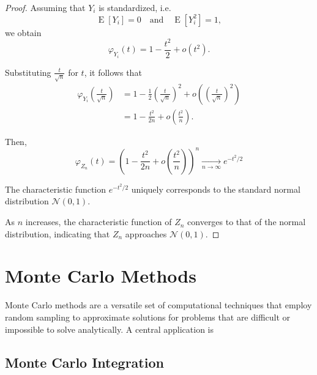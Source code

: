 \documentclass[10pt, headings=standardclasses, parskip=half, twoside]{scrartcl}
\begin{document}
\begin{proof}
Assuming that $Y_{i}$ is standardized, i.e. 
\[
\operatorname{E}\left[Y_{i}\right]=0 \quad \text{and} \quad \operatorname{E}\left[Y_{i}^2\right]=1,
\]
we obtain
\[
\varphi_{Y_{i}}(t) = 1 - \frac{t^2}{2} + o(t^2).
\]

Substituting $\frac{t}{\sqrt{n}}$ for $t$, it follows that
\begin{align*}
    \varphi_{Y_{i}}\left(\frac{t}{\sqrt{n}}\right) &= 1 - \frac{1}{2}\left(\frac{t}{\sqrt{n}}\right)^2 + o\left(\left(\frac{t}{\sqrt{n}}\right)^2\right) \\
    &= 1 - \frac{t^2}{2n} + o\left(\frac{t^2}{n}\right).
\end{align*}



Then,
\[
    \varphi_{Z_{n}}(t) = \left(1 - \frac{t^2}{2n} + o\left(\frac{t^2}{n}\right)\right)^{n} \xrightarrow[n \rightarrow \infty]{} e^{-t^{2} / 2}
\]

The characteristic function $e^{-t^{2} / 2}$ uniquely corresponds to the standard normal distribution $\mathcal{N}(0,1)$.

As $n$ increases, the characteristic function of $Z_{n}$ converges to that of the normal distribution, indicating that $Z_{n}$ approaches $\mathcal{N}(0,1)$.
\end{proof}







\clearpage
\section{Monte Carlo Methods}\label{sec:mc_methods}

Monte Carlo methods are a versatile set of computational techniques that employ random sampling to approximate solutions for problems that are difficult or impossible to solve analytically.
A central application is

\subsection{Monte Carlo Integration}\label{subsec:mc_integration}
\end{document}
